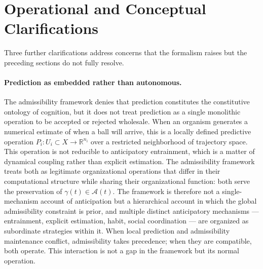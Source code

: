 \documentclass[12pt,a4paper]{report}
\theoremstyle{flyxion}
\begin{document}
\section{Operational and Conceptual Clarifications}

Three further clarifications address concerns that the formalism raises but the preceding sections do not fully resolve.

\paragraph{Prediction as embedded rather than autonomous.} The admissibility framework denies that prediction constitutes the constitutive ontology of cognition, but it does not treat prediction as a single monolithic operation to be accepted or rejected wholesale. When an organism generates a numerical estimate of when a ball will arrive, this is a locally defined predictive operation $P_i : U_i \subset X \rightarrow \mathbb{R}^{n_i}$ over a restricted neighborhood of trajectory space. This operation is not reducible to anticipatory entrainment, which is a matter of dynamical coupling rather than explicit estimation. The admissibility framework treats both as legitimate organizational operations that differ in their computational structure while sharing their organizational function: both serve the preservation of $\gamma(t) \in \mathcal{A}(t)$. The framework is therefore not a single-mechanism account of anticipation but a hierarchical account in which the global admissibility constraint is prior, and multiple distinct anticipatory mechanisms --- entrainment, explicit estimation, habit, social coordination --- are organized as subordinate strategies within it. When local prediction and admissibility maintenance conflict, admissibility takes precedence; when they are compatible, both operate. This interaction is not a gap in the framework but its normal operation.
\end{document}
